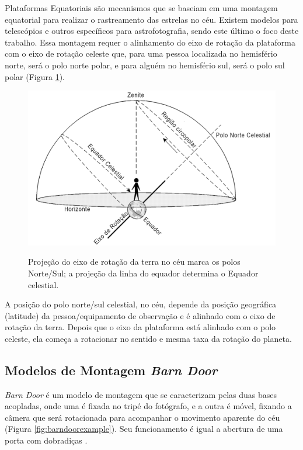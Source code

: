Plataformas Equatoriais são mecanismos que se baseiam em uma montagem equatorial para realizar o rastreamento das estrelas no céu. Existem modelos para telescópios e outros específicos para astrofotografia, sendo este último o foco deste trabalho. Essa montagem requer o alinhamento do eixo de rotação da plataforma com o eixo de rotação celeste que, para uma pessoa localizada no hemisfério norte, será o polo norte polar, e para alguém no hemisfério sul, será o polo sul polar (Figura \ref{fig:celestialchart}). 

\begin{figure}[!htb]
	\centering
	\caption{Projeção do eixo de rotação da terra no céu marca os polos Norte/Sul; a projeção da linha do equador determina o Equador celestial.}
	\includegraphics[width=0.8\linewidth]{figuras/revisaobiblio/celestialchart}
	\label{fig:celestialchart}
\end{figure}

A posição do polo norte/sul celestial, no céu, depende da posição geográfica (latitude) da pessoa/equipamento de observação e é alinhado com o eixo de rotação da terra. Depois que o eixo da plataforma está alinhado com o polo celeste, ela começa a rotacionar no sentido e mesma taxa da rotação do planeta.

\subsection[Modelos de Montagem]{Modelos de Montagem \textit{Barn Door}}
\label{sec:modelosdemontagem}
\textit{Barn Door} é um modelo de montagem que se caracterizam pelas duas bases acopladas, onde uma é fixada no tripé do fotógrafo, e a outra é móvel, fixando a câmera que será rotacionada para acompanhar o movimento aparente do céu (Figura \ref{fig:barndoorexample}). Seu funcionamento é igual a abertura de uma porta com dobradiças \cite{site:pentaxBarnDoor}. 

